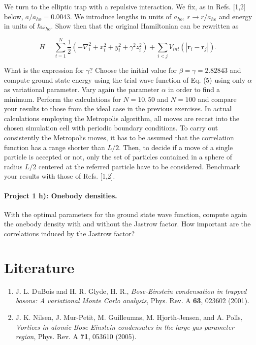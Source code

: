 \documentclass[%
oneside,                 %
final,                   %
10pt]{article}
\begin{document}
We turn to the elliptic trap with a repulsive
   interaction.  We fix, as in Refs. [1,2] below,
   $a/a_{ho}=0.0043$. We introduce lengths in units of $a_{ho}$,
   $r\rightarrow r/a_{ho}$ and energy in units of $\hbar\omega_{ho}$.
   Show then that the original Hamiltonian can be rewritten as

\begin{equation*} 
    H=\sum_{i=1}^N\frac{1}{2}\left(-\nabla^2_i+x_i^2+y_i^2+\gamma^2z_i^2\right)+\sum_{i<j}V_{int}(|\mathbf{r}_i-\mathbf{r}_j|).
 \end{equation*}

What is the expression for $\gamma$?  Choose the initial value for
 $\beta=\gamma = 2.82843$ and compute 
 ground state energy using the trial wave function of
 Eq. (5)  using only $\alpha$ as variational
 parameter.  Vary again the parameter
 $\alpha$ in order to find a minimum.
 Perform the calculations for
 $N=10,50$ and $N=100$ and compare your results to those from the
 ideal case in the previous exercises.  In actual calculations
 employing the Metropolis algorithm, all moves are recast into the
 chosen simulation cell with periodic boundary conditions. To carry
 out consistently the Metropolis moves, it has to be assumed that the
 correlation function has a range shorter than $L/2$. Then, to decide
 if a move of a single particle is accepted or not, only the set of
 particles contained in a sphere of radius $L/2$ centered at the
 referred particle have to be considered.  Benchmark your results with
 those of Refs. [1,2].

\paragraph{Project 1 h): Onebody densities.}
With the optimal parameters for the ground state wave function,
compute again the onebody density with and without the Jastrow factor.
How important are the correlations induced by the Jastrow factor?

\section*{Literature}

\begin{enumerate}
 \item J. L. DuBois and H. R. Glyde, H. R., \emph{Bose-Einstein condensation in trapped bosons: A variational Monte Carlo analysis}, Phys. Rev. A \textbf{63}, 023602 (2001).

 \item J. K. Nilsen,  J. Mur-Petit, M. Guilleumas, M. Hjorth-Jensen, and A. Polls, \emph{Vortices in atomic Bose-Einstein condensates in the large-gas-parameter region}, Phys. Rev. A \textbf{71}, 053610 (2005).
\end{enumerate}
\end{document}
